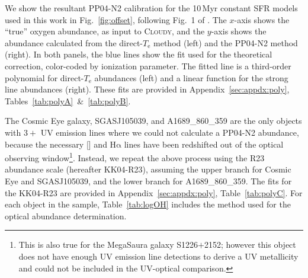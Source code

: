 \documentclass[preprint2]{aastex62}
\newcommand{\Cloudy}{\textsc{Cloudy}\xspace}
\newcommand{\ha}{\ensuremath{\mathrm{H\alpha}}\xspace}
\newcommand{\Myr}{$\,$Myr\xspace}
\newcommand{\mage}{{\sc Meg}a{\sc S}a{\sc ura}\xspace}
\newcommand{\Te}{\ensuremath{T_{\mathrm{e}}}\xspace}
\begin{document}
We show the resultant PP04-N2 calibration for the 10\Myr constant SFR models used in this work in Fig.~\ref{fig:offset}, following Fig.~1 of \citet{Stasinska+2005}. The $x$-axis shows the ``true'' oxygen abundance, as input to \Cloudy, and the $y$-axis shows the abundance calculated from the direct-\Te method (left) and the PP04-N2 method (right). In both panels, the blue lines show the fit used for the theoretical correction, color-coded by ionization parameter. The fitted line is a third-order polynomial for direct-\Te abundances (left) and a linear function for the strong line abundances (right). These fits are provided in Appendix~\ref{sec:appdx:poly}, Tables~\ref{tab:polyA}~\&~\ref{tab:polyB}.

The Cosmic Eye galaxy, SGASJ105039, and A1689\_860\_359 are the only objects with $3+$ UV emission lines where we could not calculate a PP04-N2 abundance, because the necessary [] and \ha lines have been redshifted out of the optical observing window\footnote{This is also true for the \mage galaxy S1226$+$2152; however this object does not have enough UV emission line detections to derive a UV metallicity and could not be included in the UV-optical comparison.}. Instead, we repeat the above process using the \citet{Kobulnicky+2004} R23 abundance scale (hereafter KK04-R23), assuming the upper branch for Cosmic Eye and SGASJ105039, and the lower branch for A1689\_860\_359. The fits for the KK04-R23 are provided in Appendix~\ref{sec:appdx:poly}, Table~\ref{tab:polyC}. For each object in the sample, Table~\ref{tab:logOH} includes the method used for the optical abundance determination.
\end{document}
